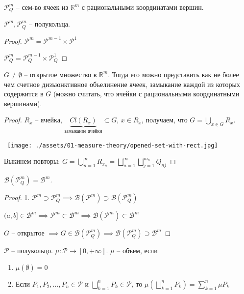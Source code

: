 $\mathcal{P}_{Q}^{m}$ -- сем-во ячеек из $\mathbb{R}^m$ с рациональными координатами вершин.

\begin{theorem}
    $\mathcal{P}^m, \mathcal{P}^m_Q$ -- полукольца.
\end{theorem}
\begin{proof}
    $\mathcal{P}^m = \mathcal{P}^{m-1} \times \mathcal{P}^1$

    $\mathcal{P}_Q^m = \mathcal{P}_Q^{m-1} \times \mathcal{P}_Q^1$
\end{proof}

\begin{theorem}
    $G \neq \emptyset$ -- открытое множество в $\mathbb{R}^m$. Тогда его можно представить как не более чем счетное дизъюнктивное объелинение ячеек, замыкание каждой из которых содержится в $G$ (можно считать, что ячейки с рациональными координатными вершинами).
\end{theorem}
\begin{proof}

    $R_x$ -- ячейка, $\underbrace{Cl  (R_x)}_{\text{замыкание ячейки}} \subset G$, $x \in R_x$, получаем, что $G = \bigcup_{x \in G} R_x$.

    \hbox{
        \texttt{[image: ./assets/01-measure-theory/opened-set-with-rect.jpg]}
    }

    Выкинем повторы: $G = \bigcup_{n=1}^{\infty} R_{x_n} = \bigsqcup_{n=1}^{\infty} \bigsqcup_{j=1}^{m_n} Q_{nj}$
\end{proof}

\begin{consequence}
    $\mathcal{B}(\mathcal{P}^m_Q) = \mathcal{B}^m$.
\end{consequence}
\begin{proof}
    
    1. $\mathcal{P}^m \supset \mathcal{P}^m_Q \implies \mathcal{B}(\mathcal{P}^m) \supset \mathcal{B}(\mathcal{P}_Q^m)$

    $(a, b] \in \mathcal{B}^m \implies \mathcal{P}^m \subset \mathcal{B}^m \implies \mathcal{B}(\mathcal{P}^m) \subset \mathcal{B}^m$

    $G$ -- открытое $\implies G \in \mathcal{B}(\mathcal{P}_Q^m) \implies \mathcal{B}(\mathcal{P}^m_Q) \supset \mathcal{B}^m$
\end{proof}

\begin{definition}
    $\mathcal{P}$ -- полукольцо. $\mu: \mathcal{P} \rightarrow [0, +\infty]$. $\mu$ -- объем, если 

    \begin{enumerate}
        \item $\mu(\emptyset) = 0$
        \item Если $P_1, P_2, \dots, P_n \in \mathcal{P}$ и $\bigsqcup_{k=1}^n P_k \in \mathcal{P}$, то $\mu \left(\bigsqcup_{k=1}^n P_k\right) = \sum_{k=1}^{n} \mu P_k$ 
    \end{enumerate}
\end{definition}


